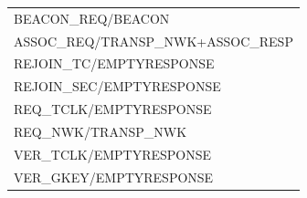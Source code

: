 \documentclass[border=4pt]{standalone}
\begin{document}
\ttfamily\small
\begin{tabular}{@{}l@{}}
BEACON\_REQ/BEACON\\
ASSOC\_REQ/TRANSP\_NWK+ASSOC\_RESP\\
REJOIN\_TC/EMPTYRESPONSE\\
REJOIN\_SEC/EMPTYRESPONSE\\
REQ\_TCLK/EMPTYRESPONSE\\
REQ\_NWK/TRANSP\_NWK\\
VER\_TCLK/EMPTYRESPONSE\\
VER\_GKEY/EMPTYRESPONSE\\
\end{tabular}
\end{document}
